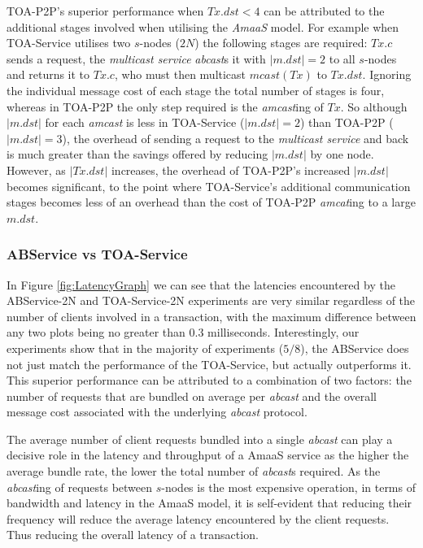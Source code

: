 	TOA-P2P's superior performance when $Tx.dst < 4$ can be attributed to the additional stages involved when utilising the \emph{AmaaS} model.  For example when TOA-Service utilises two $s$-nodes ($2N$) the following stages are required: $Tx.c$ sends a request, the \emph{multicast service} \emph{abcast}s it with $|m.dst| = 2$ to all $s$-nodes and returns it to $Tx.c$, who must then multicast $mcast(Tx)$ to $Tx.dst$.  Ignoring the individual message cost of each stage the total number of stages is four, whereas in TOA-P2P the only step required is the \emph{amcast}ing of $Tx$.  So although $|m.dst|$ for each \emph{amcast} is less in TOA-Service ($|m.dst| = 2$) than TOA-P2P ($|m.dst| = 3$), the overhead of sending a request to the \emph{multicast service} and back is much greater than the savings offered by reducing $|m.dst|$ by one node.  However, as $|Tx.dst|$ increases, the overhead of TOA-P2P's increased $|m.dst|$ becomes significant, to the point where TOA-Service's additional communication stages becomes less of an overhead than the cost of TOA-P2P \emph{amcat}ing to a large $m.dst$.  
	
    \subsubsection*{ABService vs TOA-Service}
    In Figure \ref{fig:LatencyGraph} we can see that the latencies encountered by the ABService-2N and TOA-Service-2N experiments are very similar regardless of the number of clients involved in a transaction, with the maximum difference between any two plots being no greater than $0.3$ milliseconds.  Interestingly, our experiments show that in the majority of experiments ($5/8$), the ABService does not just match the performance of the TOA-Service, but actually outperforms it.  This superior performance can be attributed to a combination of two factors: the number of requests that are bundled on average per \emph{abcast} and the overall message cost associated with the underlying \emph{abcast} protocol.  
    
    The average number of client requests bundled into a single \emph{abcast} can play a decisive role in the latency and throughput of a \textsf{AmaaS} service as the higher the average bundle rate, the lower the total number of \emph{abcast}s required.  As the \emph{abcast}ing of requests between $s$-nodes is the most expensive operation, in terms of bandwidth and latency in the \textsf{AmaaS} model, it is self-evident that reducing their frequency will reduce the average latency encountered by the client requests.  Thus reducing the overall latency of a transaction.  
    
